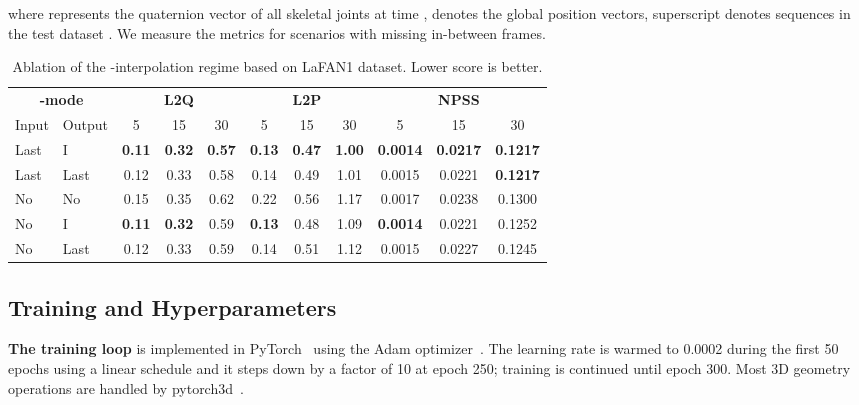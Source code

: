 \documentclass[letterpaper]{article} \usepackage[]{aaai23}  \usepackage{times}  \usepackage{helvet}  \usepackage{courier}  \usepackage[hyphens]{url}  \usepackage{graphicx} \urlstyle{rm} \def\UrlFont{\rm}  \usepackage{natbib}  \usepackage{caption} \frenchspacing  \setlength{\pdfpagewidth}{8.5in} \setlength{\pdfpageheight}{11in}
\begin{document}
where  represents the quaternion vector of all skeletal joints at time ,  denotes the global position vectors, superscript  denotes sequences in the test dataset . We measure the metrics for scenarios with  missing in-between frames.  

\begin{table*}[!ht]
\centering
\caption{Ablation of the -interpolation regime based on LaFAN1 dataset. Lower score is better.}
\centering
\begin{tabular}{llccccccccc}
\multicolumn{2}{c}{\textbf{-mode}} &\multicolumn{3}{c}{\textbf{L2Q}} &\multicolumn{3}{c}{\textbf{L2P}} &\multicolumn{3}{c}{\textbf{NPSS}} \\
\cmidrule(lr){3-5}\cmidrule(lr){6-8}\cmidrule(lr){9-11}
Input & Output & 5 & 15 & 30 & 5 & 15 & 30 & 5 & 15 & 30\\
\cmidrule(lr){1-11}
Last & I & \bf{0.11}	& \bf{0.32} &	\bf{0.57} &	\bf{0.13} &	\bf{0.47} &	\bf{1.00} &	\bf{0.0014} &	\bf{0.0217} &	\bf{0.1217} \\
Last & Last & 0.12 & 0.33 & 0.58 & 0.14 & 0.49 & 1.01 & 0.0015 & 0.0221 & \bf{0.1217} \\
No & No &  0.15 & 0.35 & 0.62 & 0.22 & 0.56 & 1.17 & 0.0017 & 0.0238 & 0.1300 \\
No & I &  \bf{0.11}  & \bf{0.32} & 0.59 & \bf{0.13} & 0.48 & 1.09 & \bf{0.0014} & 0.0221 & 0.1252 \\
No & Last &  0.12 & 0.33 & 0.59 & 0.14 & 0.51 & 1.12 & 0.0015 & 0.0227 & 0.1245 \\ 
\cmidrule(lr){1-11}
\end{tabular}
\label{tab:ablation_delta}
\end{table*}





\subsection{Training and Hyperparameters} 
\textbf{The training loop} is implemented in PyTorch~\cite{paszke2019pytorch} using the Adam optimizer~\cite{kingma2015adam}. The learning rate is warmed to 0.0002 during the first 50 epochs using a linear schedule and it steps down by a factor of 10 at epoch 250; training is continued until epoch 300. Most 3D geometry operations
are handled by pytorch3d~\citep{ravi2020pytorch3d}.
\end{document}

